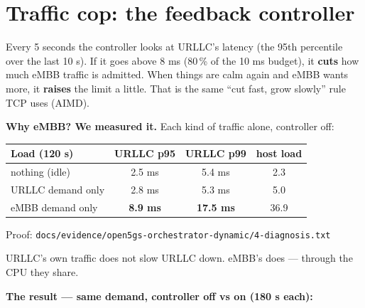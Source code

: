 \documentclass[11pt]{article}
\newcommand{\person}[3][]{%
  \begin{scope}[shift={(#2)},stick,#1]
    \draw (0,1.55) circle (0.22);
    \draw (-0.07,1.6) circle (0.012) (0.07,1.6) circle (0.012);
    \draw (-0.09,1.49) .. controls (-0.03,1.43) and (0.03,1.43) .. (0.09,1.49);
    \draw (0,1.33) -- (0,0.6);
    \draw (0,0.6) -- (-0.25,0) (0,0.6) -- (0.25,0);
    \ifx#3u\draw (0,1.15) -- (-0.35,1.55) (0,1.15) -- (0.35,1.55);\fi
    \ifx#3d\draw (0,1.15) -- (-0.3,0.75) (0,1.15) -- (0.3,0.75);\fi
    \ifx#3p\draw (0,1.15) -- (-0.3,0.75) (0,1.15) -- (0.5,1.2);\fi
    \ifx#3w\draw (0,1.15) -- (-0.3,0.75) (0,1.15) -- (0.3,1.5);\fi
    \ifx#3h\draw (0,1.15) -- (0.35,0.95) -- (0.45,1.05) (0,1.15) -- (-0.3,0.75);\fi
    \ifx#3s\draw (0,1.15) -- (-0.3,1.1) -- (-0.4,1.3) (0,1.15) -- (0.3,1.1) -- (0.4,1.3);\fi
  \end{scope}}
\newcommand{\say}[3][]{\node[draw,rounded corners=4pt,fill=white,font=\footnotesize,align=center,inner sep=3pt,#1] at (#2) {#3};}
\newcommand{\proof}[1]{\par{\footnotesize\color{grey}Proof: \texttt{#1}}\par}
\begin{document}
\newpage
\section{Traffic cop: the feedback controller}

\begin{center}
\end{center}

Every 5 seconds the controller looks at URLLC's latency (the 95th percentile over the last 10 s).
If it goes above 8 ms (80\,\% of the 10 ms budget), it \textbf{cuts} how much eMBB traffic is
admitted. When things are calm again and eMBB wants more, it \textbf{raises} the limit a little.
That is the same ``cut fast, grow slowly'' rule TCP uses (AIMD).

\textbf{Why eMBB? We measured it.} Each kind of traffic alone, controller off:

\begin{tabularx}{\linewidth}{@{}Xccc@{}}
\toprule
\textbf{Load (120 s)} & \textbf{URLLC p95} & \textbf{URLLC p99} & \textbf{host load} \\ \midrule
nothing (idle) & 2.5 ms & 5.4 ms & 2.3 \\
URLLC demand only & 2.8 ms & 5.3 ms & 5.0 \\
eMBB demand only & \textbf{8.9 ms} & \textbf{17.5 ms} & 36.9 \\
\bottomrule
\end{tabularx}
\proof{docs/evidence/open5gs-orchestrator-dynamic/4-diagnosis.txt}

URLLC's own traffic does not slow URLLC down. eMBB's does — through the CPU they share.

\textbf{The result — same demand, controller off vs on (180 s each):}
\end{document}
